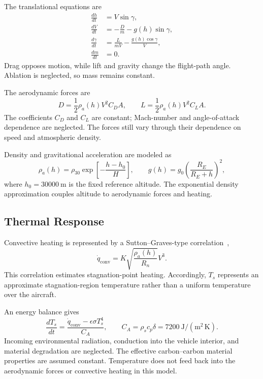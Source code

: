 \documentclass[conf]{new-aiaa}
\begin{document}
The translational equations are
\begin{align}
\frac{dh}{dt} &= V\sin\gamma, \\
\frac{dV}{dt} &= -\frac{D}{m}-g(h)\sin\gamma, \\
\frac{d\gamma}{dt} &= \frac{L}{mV}-\frac{g(h)\cos\gamma}{V}, \\
\frac{dm}{dt} &= 0.
\end{align}
Drag opposes motion, while lift and gravity change the flight-path angle.
Ablation is neglected, so mass remains constant.

The aerodynamic forces are
\begin{equation}
D=\frac12\rho_a(h)V^2C_DA,
\qquad
L=\frac12\rho_a(h)V^2C_LA.
\end{equation}
The coefficients $C_D$ and $C_L$ are constant; Mach-number and
angle-of-attack dependence are neglected. The forces still vary through
their dependence on speed and atmospheric density.

Density and gravitational acceleration are modeled as
\begin{equation}
\rho_a(h)=\rho_{30}\exp\left[-\frac{h-h_0}{H}\right],
\qquad
g(h)=g_0\left(\frac{R_E}{R_E+h}\right)^2,
\end{equation}
where $h_0=30000~\mathrm{m}$ is the fixed reference altitude.
The exponential density approximation couples altitude to aerodynamic forces
and heating.

\subsection{Thermal Response}

Convective heating is represented by a Sutton--Graves-type correlation~\cite{sutton-graves},
\begin{equation}
\dot q_{\mathrm{conv}}=K\sqrt{\frac{\rho_a(h)}{R_n}}V^3.
\end{equation}
This correlation estimates stagnation-point heating. Accordingly, $T_s$
represents an approximate stagnation-region temperature rather than a
uniform temperature over the aircraft.

An energy balance gives
\begin{equation}
\frac{dT_s}{dt}
=\frac{\dot q_{\mathrm{conv}}-\epsilon\sigma T_s^4}{C_A},
\qquad
C_A=\rho_s c_p\delta=7200~\mathrm{J/(m^2\,K)}.
\end{equation}
Incoming environmental radiation, conduction into the vehicle interior,
and material degradation are neglected. The effective carbon--carbon
material properties are assumed constant. Temperature does not feed back
into the aerodynamic forces or convective heating in this model.
\end{document}
